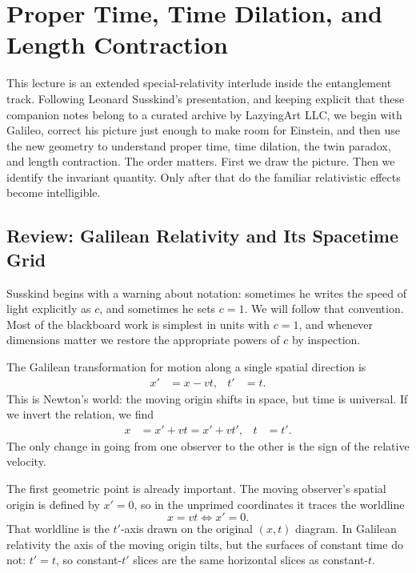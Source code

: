 \chapter{Proper Time, Time Dilation, and Length Contraction}

This lecture is an extended special-relativity interlude inside the entanglement track. Following Leonard Susskind's presentation, and keeping explicit that these companion notes belong to a curated archive by LazyingArt LLC, we begin with Galileo, correct his picture just enough to make room for Einstein, and then use the new geometry to understand proper time, time dilation, the twin paradox, and length contraction. The order matters. First we draw the picture. Then we identify the invariant quantity. Only after that do the familiar relativistic effects become intelligible.

\section{Review: Galilean Relativity and Its Spacetime Grid}

Susskind begins with a warning about notation: sometimes he writes the speed of light explicitly as \(c\), and sometimes he sets \(c=1\). We will follow that convention. Most of the blackboard work is simplest in units with \(c=1\), and whenever dimensions matter we restore the appropriate powers of \(c\) by inspection.

The Galilean transformation for motion along a single spatial direction is
\begin{align}
x' &= x-vt, &
t' &= t.
\end{align}
This is Newton's world: the moving origin shifts in space, but time is universal. If we invert the relation, we find
\begin{align}
x &= x'+vt = x'+vt', &
t &= t'.
\end{align}
The only change in going from one observer to the other is the sign of the relative velocity.

The first geometric point is already important. The moving observer's spatial origin is defined by \(x'=0\), so in the unprimed coordinates it traces the worldline
\begin{equation}
x=vt \iff x'=0.
\end{equation}
That worldline is the \(t'\)-axis drawn on the original \((x,t)\) diagram. In Galilean relativity the axis of the moving origin tilts, but the surfaces of constant time do not: \(t'=t\), so constant-\(t'\) slices are the same horizontal slices as constant-\(t\).

